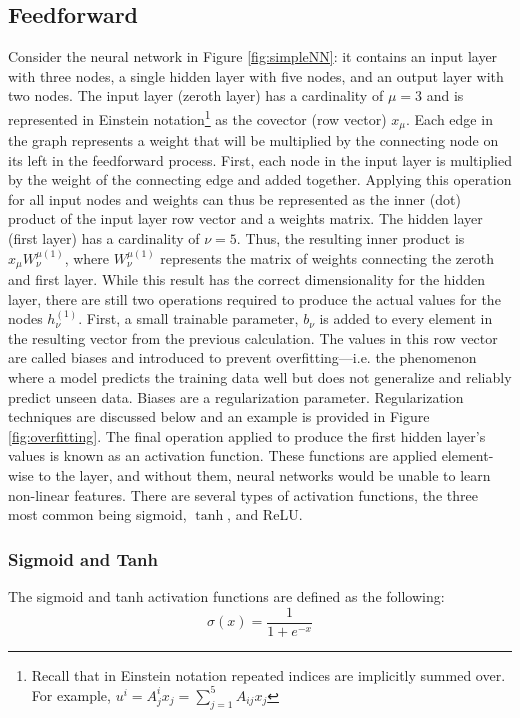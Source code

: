\subsection{Feedforward} \label{sec:feedfoward}
Consider the neural network in Figure \ref{fig:simpleNN}: it contains an input layer with three nodes, a single hidden layer with five nodes, and an output layer with two nodes. The input layer (zeroth layer) has a cardinality of $ \mu=3 $ and is represented in Einstein notation\footnote{Recall that in Einstein notation repeated indices are implicitly summed over. For example, ${u^i = A^i_j x_j = \sum_{j=1}^5 A_{ij} x_j}$ } as the covector (row vector) $ x_\mu $. Each edge in the graph represents a weight that will be multiplied by the connecting node on its left in the feedforward process. First, each node in the input layer is multiplied by the weight of the connecting edge and added together. Applying this operation for all input nodes and weights can thus be represented as the inner (dot) product of the input layer row vector and a weights matrix. The hidden layer (first layer) has a cardinality of $ \nu=5 $. Thus, the resulting inner product is $ x_\mu W_\nu^{\mu(1)} $, where $ W_\nu^{\mu(1)} $ represents the matrix of weights connecting the zeroth and first layer. While this result has the correct dimensionality for the hidden layer, there are still two operations required to produce the actual values for the nodes $ h_\nu^{(1)} $. First, a small trainable parameter, $ b_\nu $  is added to every element in the resulting vector from the previous calculation. The values in this row vector are called biases and introduced to prevent overfitting---i.e. the phenomenon where a model predicts the training data well but does not generalize and reliably predict unseen data. Biases are a regularization parameter. Regularization techniques are discussed below and an example is provided in Figure \ref{fig:overfitting}. The final operation applied to produce the first hidden layer's values is known as an activation function. These functions are applied element-wise to the layer, and without them, neural networks would be unable to learn non-linear features. There are several types of activation functions, the three most common being sigmoid, $\tanh$, and ReLU.


\subsubsection{Sigmoid and Tanh}
The sigmoid and tanh activation functions are defined as the following:
\begin{equation}
    \label{sigmoid}
    \sigma (x) = \frac{1}{1 + e^{-x}}
\end{equation}

